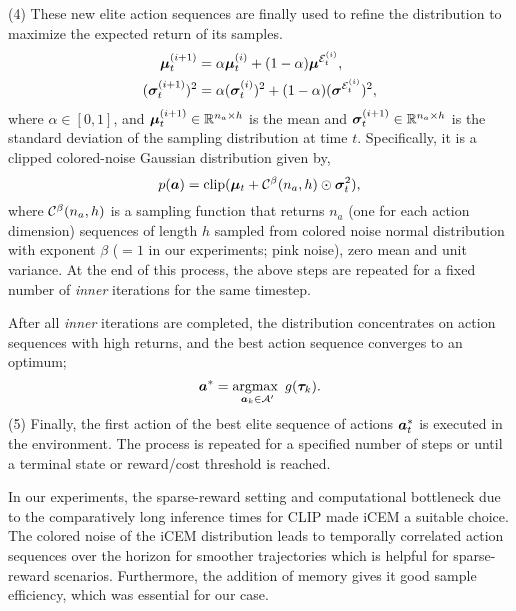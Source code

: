(4) These new elite action sequences are finally used to refine the distribution to maximize the expected return of its samples.
\vspace{-1.5pt}
\begin{align}
    \label{eq:icem-update}
    \bm{\mu}_{t}^{(i+1)} &= \alpha\bm{\mu}_t^{(i)} + (1-\alpha)\bm{\mu}^{\mathcal{E}_t^{(i)}},\\
    (\bm{\sigma}_{t}^{(i+1)})^2 &= \alpha(\bm{\sigma}_t^{(i)})^2 + (1-\alpha)(\bm{\sigma}^{\mathcal{E}_t^{(i)}})^2,
\end{align}
where \(\alpha \in [0, 1]\), and \(\bm{\mu}_{t}^{(i+1)} \in \mathbb{R}^{n_a \times h}\) is the mean and \(\bm{\sigma}_{t}^{(i+1)} \in \mathbb{R}^{n_a \times h}\) is the standard deviation of the sampling distribution at time \(t\). Specifically, it is a clipped colored-noise Gaussian distribution given by,
\begin{equation}
    \label{eq:icem-distribution}
    p(\bm{a}) = \text{clip}(\bm{\mu}_t + \mathcal{C}^\beta(n_a, h) \odot \bm{\sigma}_t^2),
\end{equation}
where \(\mathcal{C}^\beta(n_a, h)\) is a sampling function that returns \(n_a\) (one for each action dimension) sequences of length \(h\) sampled from colored noise normal distribution with exponent \(\beta\) (\(= 1\) in our experiments; pink noise), zero mean and unit variance. 
At the end of this process, the above steps are repeated for a fixed number of \textit{inner} iterations for the same timestep.

After all \textit{inner} iterations are completed, the distribution concentrates on action sequences with high returns, and the best action sequence converges to an optimum;
\begin{equation}
    \label{eq:planning-goal}
    \bm{a}^* = \operatorname*{argmax~}_{\bm{a}_k \in \mathcal{A}'} g(\bm{\tau}_k).
\end{equation}
(5) Finally, the first action of the best elite sequence of actions \(\bm{a}^*_t\) is executed in the environment.
The process is repeated for a specified number of steps or until a terminal state or reward/cost threshold is reached.

In our experiments, the sparse-reward setting and computational bottleneck due to the comparatively long inference times for CLIP made iCEM a suitable choice.
The colored noise of the iCEM distribution leads to temporally correlated action sequences over the horizon for smoother trajectories which is helpful for sparse-reward scenarios.
Furthermore, the addition of memory gives it good sample efficiency, which was essential for our case.

